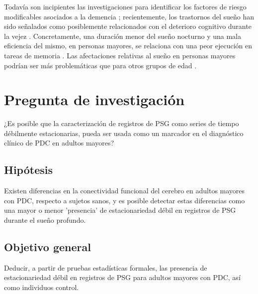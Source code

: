 \documentclass[12pt,a4paper]{mitthesis}
\begin{document}
Todav\'ia son incipientes las investigaciones para identificar los factores de riesgo modificables 
asociados a la demencia \cite{PlanAlzheimer04}; recientemente, los trastornos del sue\~no han sido 
se\~nalados como posiblemente relacionados con el deterioro cognitivo durante la vejez 
\cite{Amer13,Miyata13,Potvin12}. Concretamente, una duraci\'on menor del sue\~no nocturno y una 
mala eficiencia del mismo, en personas mayores, se relaciona con una peor ejecuci\'on en tareas de 
memoria \cite{Reid06}. Las afectaciones relativas al sue\~no en personas mayores podr\'ian ser 
m\'as problem\'aticas que para otros grupos de edad \cite{Potvin12}.


\section{Pregunta de investigaci\'on}

¿Es posible que la caracterizaci\'on de registros de PSG como series de tiempo d\'ebilmente 
estacionarias, pueda ser usada como un marcador en el diagn\'ostico cl\'inico de PDC en adultos 
mayores?


\subsection{Hip\'otesis}

Existen diferencias en la conectividad funcional del cerebro en adultos mayores con PDC, respecto
a sujetos sanos, y es posible detectar estas diferencias como una mayor o menor 'presencia' de 
estacionariedad d\'ebil en registros de PSG durante el sue\~no profundo.


\subsection{Objetivo general}

Deducir, a partir de pruebas estad\'isticas formales, las presencia de estacionariedad d\'ebil en
registros de PSG para adultos mayores con PDC, as\'i como individuos control.
\end{document}
